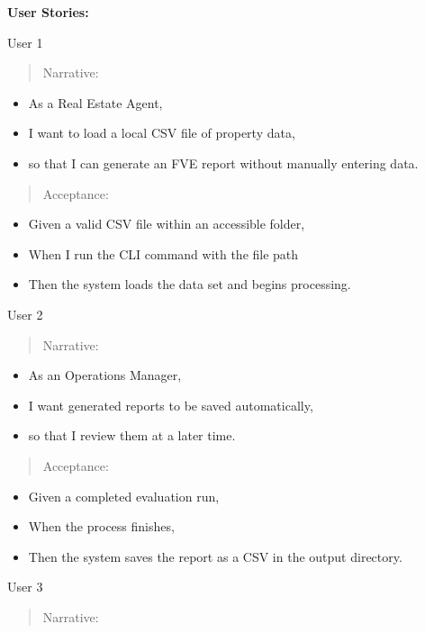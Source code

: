 \textbf{User Stories:}

User 1

\begin{quote}
Narrative:
\end{quote}

\begin{itemize}
\item
  As a Real Estate Agent,
\item
  I want to load a local CSV file of property data,
\item
  so that I can generate an FVE report without manually entering data.
\end{itemize}

\begin{quote}
Acceptance:
\end{quote}

\begin{itemize}
\item
  Given a valid CSV file within an accessible folder,
\item
  When I run the CLI command with the file path
\item
  Then the system loads the data set and begins processing.
\end{itemize}

User 2

\begin{quote}
Narrative:
\end{quote}

\begin{itemize}
\item
  As an Operations Manager,
\item
  I want generated reports to be saved automatically,
\item
  so that I review them at a later time.
\end{itemize}

\begin{quote}
Acceptance:
\end{quote}

\begin{itemize}
\item
  Given a completed evaluation run,
\item
  When the process finishes,
\item
  Then the system saves the report as a CSV in the output directory.
\end{itemize}

User 3

\begin{quote}
Narrative:
\end{quote}

